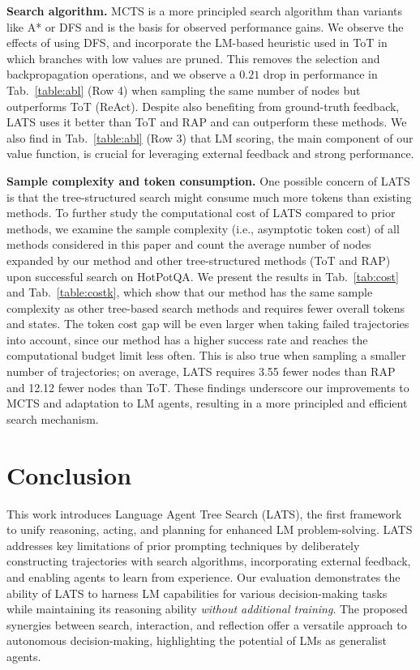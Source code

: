 \documentclass{article}
\theoremstyle{plain}
\theoremstyle{definition}
\theoremstyle{remark}
\begin{document}




\textbf{Search algorithm.} MCTS is a more principled search algorithm than variants like A* \cite{zhuang2023toolchain} or DFS and is the basis for observed performance gains. We observe the effects of using DFS, and incorporate the LM-based heuristic used in ToT in which branches with low values are pruned. This removes the selection and backpropagation operations, and we observe a $0.21$ drop in performance in Tab.~\ref{table:abl} (Row 4) when sampling the same number of nodes but outperforms ToT (ReAct). {Despite also benefiting from ground-truth feedback, LATS uses it better than ToT and RAP and can outperform these methods.} We also find in Tab.~\ref{table:abl} (Row 3) that LM scoring, the main component of our value function, is crucial for leveraging external feedback and strong performance.

{\textbf{Sample complexity and token consumption.} One possible concern of LATS is that the tree-structured search might consume much more tokens than existing methods. To further study the computational cost of LATS compared to prior methods, we examine the sample complexity (i.e., asymptotic token cost) of all methods considered in this paper and count the average number of nodes expanded by our method and other tree-structured methods (ToT and RAP) upon successful search on HotPotQA. We present the results in Tab.~\ref{tab:cost} and Tab.~\ref{table:costk}, which show that our method has the same sample complexity as other tree-based search methods and requires fewer overall tokens and states. The token cost gap will be even larger when taking failed trajectories into account, since our method has a higher success rate and reaches the computational budget limit less often. This is also true when sampling a smaller number of trajectories; on average, LATS requires 3.55 fewer nodes than RAP and 12.12 fewer nodes than ToT. These findings underscore our improvements to MCTS and adaptation to LM agents, resulting in a more principled and efficient search mechanism.}

\vspace{0.2mm}
\section{Conclusion}
\label{sec:conclusion}
\vspace{1.2mm}

This work introduces Language Agent Tree Search (LATS), the first framework to unify reasoning, acting, and planning for enhanced LM problem-solving. LATS addresses key limitations of prior prompting techniques by deliberately constructing trajectories with search algorithms, incorporating external feedback, and enabling agents to learn from experience. Our evaluation demonstrates the ability of LATS to harness LM capabilities for various decision-making tasks while maintaining its reasoning ability \emph{without additional training}. The proposed synergies between search, interaction, and reflection offer a versatile approach to autonomous decision-making, highlighting the potential of LMs as generalist agents. 
\end{document}
